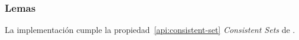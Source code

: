 


\subsubsection{Lemas}

\begin{lemma}
  La implementación \hashchain cumple la propiedad~\ref{api:consistent-set} \textit{Consistent Sets} de \setchain.
\end{lemma}

